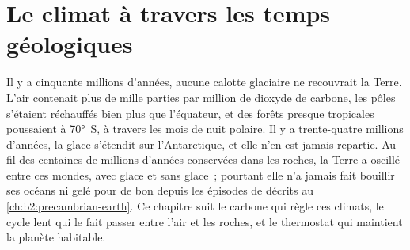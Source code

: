 \chapter{Le climat à travers les temps géologiques}\label{ch:b2:deep-time-climate}

Il y a cinquante millions d'années, aucune calotte glaciaire ne recouvrait la Terre. L'air contenait plus de
mille parties par million de dioxyde de carbone, les pôles s'étaient réchauffés bien plus que l'équateur, et
des forêts presque tropicales poussaient à \ang{70}~S, à travers les mois de nuit polaire. Il y a trente-quatre
millions d'années, la glace s'étendit sur l'Antarctique, et elle n'en est jamais repartie. Au fil des centaines de millions
d'années conservées dans les roches, la Terre a oscillé entre ces mondes, avec glace et sans glace~; pourtant elle
n'a jamais fait bouillir ses océans ni gelé pour de bon depuis les épisodes de  décrits au
\cref{ch:b2:precambrian-earth}. Ce chapitre suit le carbone qui règle ces climats, le cycle lent qui le fait passer
entre l'air et les roches, et le thermostat qui maintient la planète
habitable.

